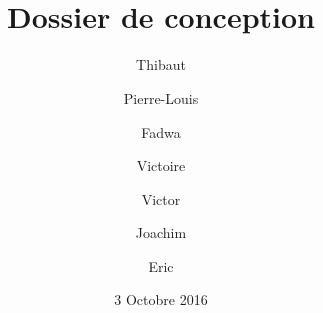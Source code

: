 \documentclass{article}
\title{\bsc{PLD Agile} \\ Dossier de conception}
\author{Thibaut \bsc{Fernandez} \and Pierre-Louis \bsc{Lefebvre} \and Fadwa \bsc{Messaoudi} \and Victoire \bsc{Chapelle} \and Victor \bsc{Capelle} \and Joachim \bsc{Dorel} \and Eric \bsc{Jordan}}
\date{3 Octobre 2016}
\begin{document}
\maketitle
\tableofcontents




\glsDisplay
\end{document}
